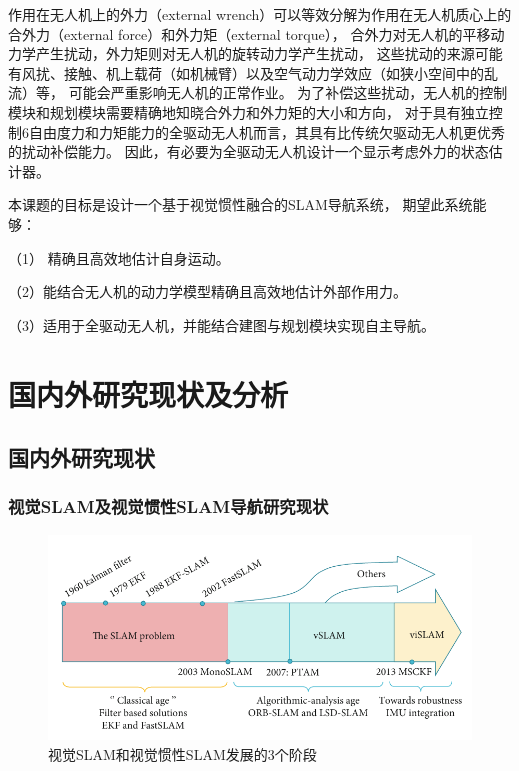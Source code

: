 作用在无人机上的外力（external wrench）可以等效分解为作用在无人机质心上的合外力（external force）和外力矩（external torque），
合外力对无人机的平移动力学产生扰动，外力矩则对无人机的旋转动力学产生扰动，
这些扰动的来源可能有风扰、接触、机上载荷（如机械臂）以及空气动力学效应（如狭小空间中的乱流）等，
可能会严重影响无人机的正常作业。
为了补偿这些扰动，无人机的控制模块和规划模块需要精确地知晓合外力和外力矩的大小和方向\cite{ding2021vid}，
对于具有独立控制6自由度力和力矩能力的全驱动无人机而言，其具有比传统欠驱动无人机更优秀的扰动补偿能力。
因此，有必要为全驱动无人机设计一个显示考虑外力的状态估计器。

本课题的目标是设计一个基于视觉惯性融合的SLAM导航系统，
期望此系统能够：

（1） 精确且高效地估计自身运动。

（2）能结合无人机的动力学模型精确且高效地估计外部作用力。
 
（3）适用于全驱动无人机，并能结合建图与规划模块实现自主导航。


\section{国内外研究现状及分析}

\subsection{国内外研究现状}
\subsubsection{视觉SLAM及视觉惯性SLAM导航研究现状}\label{subsubsec:status_of_vslam_and_vislam}

\begin{figure}[htbp]
    \centering
    \includegraphics[width = \textwidth]{figures/vslam_history.png}
    \caption{视觉SLAM和视觉惯性SLAM发展的3个阶段\cite{servieres2021visual}}
    \label{fig:vslam_history}
\end{figure}

